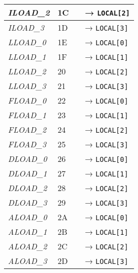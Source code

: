 \begin{center}
\begin{longtable}{ | p{} | p{} | p{} | p{} | }
        \emph{ILOAD\_2}
		& 1C & & → \lstinline|LOCAL[2]|
		\\ \hline

        \emph{ILOAD\_3}
		& 1D & & → \lstinline|LOCAL[3]|
		\\ \hline
        
        \emph{LLOAD\_0}
		& 1E & & → \lstinline|LOCAL[0]|
		\\ \hline

        \emph{LLOAD\_1}
		& 1F & & → \lstinline|LOCAL[1]|
		\\ \hline

        \emph{LLOAD\_2}
		& 20 & & → \lstinline|LOCAL[2]|
		\\ \hline

        \emph{LLOAD\_3}
		& 21 & & → \lstinline|LOCAL[3]|
		\\ \hline

        \emph{FLOAD\_0}
		& 22 & & → \lstinline|LOCAL[0]|
		\\ \hline

        \emph{FLOAD\_1}
		& 23 & & → \lstinline|LOCAL[1]|
		\\ \hline

        \emph{FLOAD\_2}
		& 24 & & → \lstinline|LOCAL[2]|
		\\ \hline

        \emph{FLOAD\_3}
		& 25 & & → \lstinline|LOCAL[3]|
		\\ \hline
        
        \emph{DLOAD\_0}
		& 26 & & → \lstinline|LOCAL[0]|
		\\ \hline

        \emph{DLOAD\_1}
		& 27 & & → \lstinline|LOCAL[1]|
		\\ \hline

        \emph{DLOAD\_2}
		& 28 & & → \lstinline|LOCAL[2]|
		\\ \hline

        \emph{DLOAD\_3}
		& 29 & & → \lstinline|LOCAL[3]|
		\\ \hline
        
        \emph{ALOAD\_0}
		& 2A & & → \lstinline|LOCAL[0]|
		\\ \hline

        \emph{ALOAD\_1}
		& 2B & & → \lstinline|LOCAL[1]|
		\\ \hline

        \emph{ALOAD\_2}
		& 2C & & → \lstinline|LOCAL[2]|
		\\ \hline

        \emph{ALOAD\_3}
		& 2D & & → \lstinline|LOCAL[3]|
		\\ \hline
        

\end{longtable}
\end{center}
